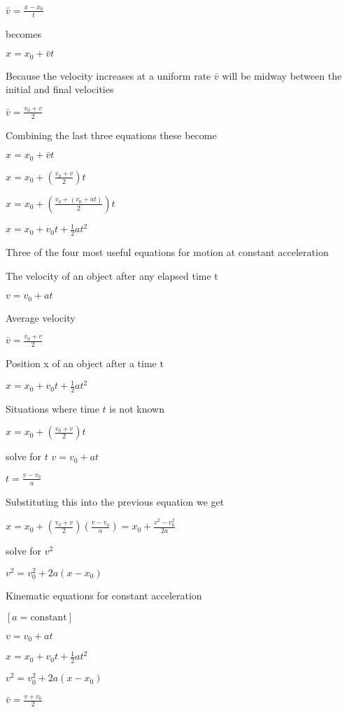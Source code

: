 \documentclass{extarticle}
\begin{document}
\begin{tcolorbox}[enhanced jigsaw,sharp corners,coltext=black,colback=BurntOrange!25!white,boxrule=0pt,breakable,size=minimal]
$\bar{v} = \frac{x - x_0}{t}$

becomes

$x = x_0 + \bar{v}t$


Because the velocity increases at a uniform rate $\bar{v}$ will be midway between the initial and final velocities

$\bar{v} = \frac{v_0 + v}{2}$


Combining the last three equations these become

$x = x_0 + \bar{v}t$

$x = x_0 + (\frac{v_0 + v}{2})t$

$x = x_0 + (\frac{v_0 + (v_0 + at)}{2})t$

$x = x_0 + v_0t + \frac{1}{2}at^2$



Three of the four most useful equations for motion at constant acceleration 

The velocity of an object after any elapsed time t

$v = v_0 + at$

Average velocity

$\bar{v} = \frac{v_0 + v}{2}$

Position x of an object after a time t

$x = x_0 + v_0t + \frac{1}{2}at^2$



Situations where time $t$ is not known

$x = x_0 + (\frac{v_0 + v}{2})t$


solve for $t$
$v = v_0 + at$

$t = \frac{v - v_0}{a}$

Substituting this into the previous equation we get 

$x = x_0 + (\frac{v_0 + v}{2})(\frac{v - v_0}{a}) = x_0 + \frac{v^2 - v_0^2}{2a}$

solve for $v^2$

$v^2 = v_0^2 + 2a(x - x_0)$








Kinematic equations for constant acceleration 

$[a = \text{constant}]$

$v = v_0 + at$

$x = x_0 + v_0t + \frac{1}{2}at^2$

$v^2 = v_0^2 + 2a(x - x_0)$

$\bar{v} = \frac{v + v_0}{2}$




\end{tcolorbox}
\end{document}
